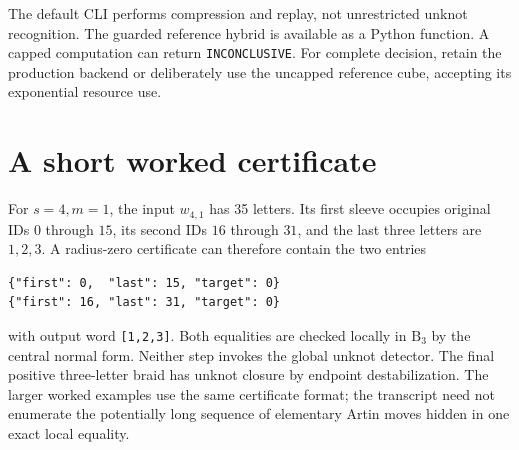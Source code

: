 \documentclass[11pt]{article}
\theoremstyle{definition}
\theoremstyle{remark}
\newcommand{\B}{\mathrm B}
\begin{document}
The default CLI performs compression and replay, not unrestricted unknot
recognition. The guarded reference hybrid is available as a Python function.
A capped computation can return \texttt{INCONCLUSIVE}. For complete decision,
retain the production backend or deliberately use the uncapped reference
cube, accepting its exponential resource use.

\section{A short worked certificate}
For $s=4,m=1$, the input $w_{4,1}$ has 35 letters. Its first sleeve occupies
original IDs $0$ through $15$, its second IDs $16$ through $31$, and the
last three letters are $1,2,3$. A radius-zero certificate can therefore
contain the two entries
\begin{lstlisting}
{"first": 0,  "last": 15, "target": 0}
{"first": 16, "last": 31, "target": 0}
\end{lstlisting}
with output word \texttt{[1,2,3]}. Both equalities are checked locally in
$\B_3$ by the central normal form. Neither step invokes the global unknot
detector. The final positive three-letter braid has unknot closure by
endpoint destabilization. The larger worked examples use the same
certificate format; the transcript need not enumerate the potentially long
sequence of elementary Artin moves hidden in one exact local equality.

\clearpage
\end{document}
